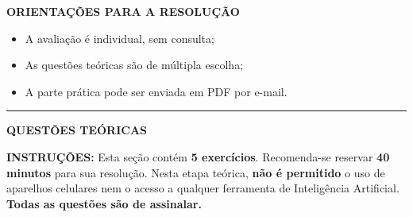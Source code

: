 \documentclass[12pt,a4paper]{article}
\begin{document}
\textbf{ORIENTAÇÕES PARA A RESOLUÇÃO}  

\begin{itemize}
    \item A avaliação é individual, sem consulta;
    \item As questões teóricas são de múltipla escolha;
    \item A parte prática pode ser enviada em PDF por e-mail.
\end{itemize}

\vspace{0.5cm}

\begin{center}
    \rule{\textwidth}{0.4pt}
    \textbf{QUESTÕES TEÓRICAS}
\end{center}

\vspace{0.2cm}

\textbf{INSTRUÇÕES:} Esta seção contém \textbf{5 exercícios}. Recomenda-se reservar \textbf{40 minutos} para sua resolução. Nesta etapa teórica, \textbf{não é permitido} o uso de aparelhos celulares nem o acesso a qualquer ferramenta de Inteligência Artificial. \textbf{Todas as questões são de assinalar.}

\vspace{0.3cm}
\end{document}
